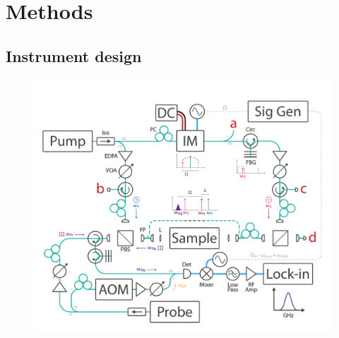 \documentclass[%
  reprint,
  superscriptaddress,
  amsmath,amssymb,
  aps,
  prapplied,
]{revtex4-2}
\begin{document}
\section{Methods}\label{Methods}
\subsection*{Instrument design}
\label{Methods:Instrument Design}

\begin{figure}[htbp]
\centering
\includegraphics[width=\textwidth]{Instrument-Design-V1.pdf}
\caption{
}
\end{figure}
\end{document}
